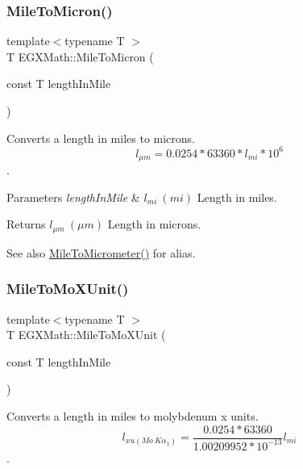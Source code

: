 \subsubsection{\texorpdfstring{Mile\+To\+Micron()}{MileToMicron()}}
{\footnotesize\ttfamily template$<$typename T $>$ \\
T E\+G\+X\+Math\+::\+Mile\+To\+Micron (\begin{DoxyParamCaption}\item[{const T}]{length\+In\+Mile }\end{DoxyParamCaption})}



Converts a length in miles to microns. \[ l_{\mu m}=0.0254 * 63360 * l_{mi} * 10^{6} \]. 


\begin{DoxyParams}{Parameters}
{\em length\+In\+Mile} & $ l_{mi}\ (mi)$ Length in miles. \\
\hline
\end{DoxyParams}
\begin{DoxyReturn}{Returns}
$ l_{\mu m}\ (\mu m)$ Length in microns. 
\end{DoxyReturn}
\begin{DoxySeeAlso}{See also}
\mbox{\hyperlink{group___e_g_x_math-_conversions-_length_conversions-_imperial-_mile-_s_i_ga59355064bc6419c5dc24f89bb13ec070}{Mile\+To\+Micrometer()}} for alias. 
\end{DoxySeeAlso}
\mbox{\label{group___e_g_x_math-_conversions-_length_conversions-_imperial-_mile-_non-_s_i_gadefb09bf42157adb9c7a458b93e3a851}} 
\subsubsection{\texorpdfstring{Mile\+To\+Mo\+X\+Unit()}{MileToMoXUnit()}}
{\footnotesize\ttfamily template$<$typename T $>$ \\
T E\+G\+X\+Math\+::\+Mile\+To\+Mo\+X\+Unit (\begin{DoxyParamCaption}\item[{const T}]{length\+In\+Mile }\end{DoxyParamCaption})}



Converts a length in miles to molybdenum x units. \[ l_{xu(Mo\ K\alpha_1)}=\frac{0.0254 * 63360}{1.00209952*10^{-13}} l_{mi}\]. 



